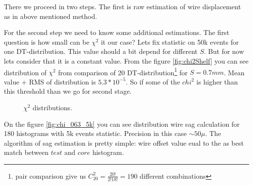 \documentclass[]{article}
\begin{document}
	There we proceed in two steps. The first is raw estimation of wire displacement as in above mentioned method.
	
	For the second step we need to know some additional estimations.	The first question is how small can be  $\chi^2$ it our case? Lets fix statistic on 50k events for one DT-distribution. This value should a bit depend for different $S$. But for now lets consider that it is a constant value. From the figure \ref{fig:chi2Shelf} you can see distribution of $\chi^2$ from comparison of 20 DT-distribution\footnote{pair comparison give us $C_{20}^2 = \frac{20!}{2!18!}=190$ different combinations}  for $S=0.7mm$. Mean value + RMS of distribution is $ 5.3*10^{-5}$. So if some of the $chi^2$ is higher than this threshold than we go for second stage.
	
	
	\begin{figure}[h!]
		\centering
		\qquad
		\caption{$\chi^2$ distributions.}			
	\end{figure}	
	

	 
	
	On the figure \ref{fig:chi_063_5k} you can see distribution wire sag calculation for 180 histograms with 5k events statistic. Precision in this case  $\sim 50\mu$. The algorithm of sag estimation is pretty simple: wire offset value eual to the as best match between $test$ and $core$ histogram.
\end{document}
